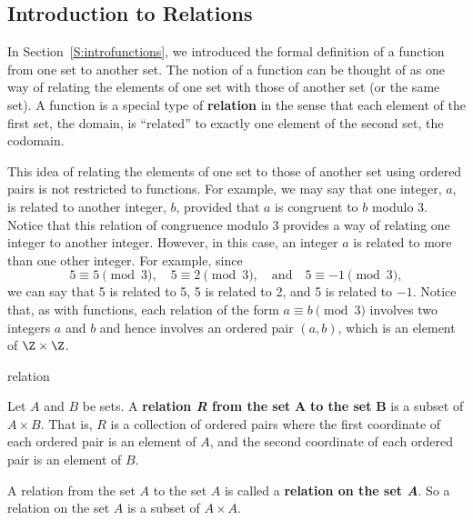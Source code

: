 \subsection*{Introduction to Relations}
In Section~\ref{S:introfunctions}, we introduced the formal definition of a function from one set to another set.  The notion of a function can be thought of as one way of relating the elements of one set with those of another set (or the same set).  A function is a special type of \textbf{relation} in the sense that each element of the first set, the domain,  is ``related'' to exactly one element of the second set, the codomain. 

This idea of relating the elements of one set to those of another set using ordered pairs is not restricted to functions.  For example, we may say that one integer, $a$, is related to another integer, $b$, provided that  $a$  is congruent to  $b$  modulo 3.  Notice that this relation of congruence modulo 3 provides a way of relating one integer to another integer.  However, in this case, an integer  $a$  is related to more than one other integer.  For example, since
\[
5 \equiv 5 \pmod 3\!, \quad 5 \equiv 2 \pmod 3\!, \quad \text{and} \quad 5 \equiv -1 \pmod 3\!,
\]
\noindent
we can say that 5 is related to 5, 5 is related to 2, and 5 is related to $-1$.  Notice that, as with functions, each relation of the form  
$a \equiv b \pmod 3$ involves two integers  $a$  and  $b$ and hence involves an ordered pair  
$\left( {a, b} \right)$, which is an element of  $\Z \times \Z$.  

\begin{defbox}{relation}{Let $A$ and $B$ be sets.  A \textbf{relation \emph{R} from the set}
  $\boldsymbol{A}$  \textbf{to the set}  $\boldsymbol{B}$  is a subset of  $A \times B$.  That is,  $R$ is a collection of ordered pairs where the first coordinate of each ordered pair is an element of $A$, and the second coordinate of each ordered pair is an element of  $B$.

\newpar
A relation from the set $A$ to the set $A$ is called a  \textbf{relation on the set \emph{A}}.  So a relation on the set $A$ is a subset of  $A \times A$.}
\end{defbox}

